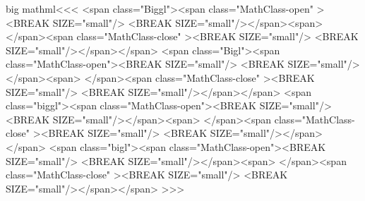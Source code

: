 {\<big mathml\><<<
   {\bgroup
          {<span class="Biggl"><span class="MathClass-open" ><BREAK SIZE="small"/>}
          {<BREAK SIZE="small"/></span><span>}
          {}%
   }
   {\egroup}
   {\bgroup
          {</span><span class="MathClass-close" ><BREAK SIZE="small"/>}
          {<BREAK SIZE="small"/></span></span>}
          {}%
   }
   {\egroup}
   {\bgroup
          {<span class="Bigl"><span class="MathClass-open"><BREAK SIZE="small"/>}
          {<BREAK SIZE="small"/></span><span>}
          {}%
   }
   {\egroup}
   {\bgroup
          {</span><span class="MathClass-close" ><BREAK SIZE="small"/>}
          {<BREAK SIZE="small"/></span></span>}
          {}%
   }
   {\egroup}
   {\bgroup
          {<span class="biggl"><span class="MathClass-open"><BREAK SIZE="small"/>}
          {<BREAK SIZE="small"/></span><span>}
          {}%
   }
   {\egroup}
   {\bgroup
          {</span><span class="MathClass-close" ><BREAK SIZE="small"/>}
          {<BREAK SIZE="small"/></span></span>}
          {}%
   }
   {\egroup}
   {\bgroup
          {<span class="bigl"><span class="MathClass-open"><BREAK SIZE="small"/>}
          {<BREAK SIZE="small"/></span><span>}
          {}%
   }
   {\egroup}
   {\bgroup
          {</span><span class="MathClass-close" ><BREAK SIZE="small"/>}
          {<BREAK SIZE="small"/></span></span>}
          {}%
   }
   {\egroup}
>>>




}
